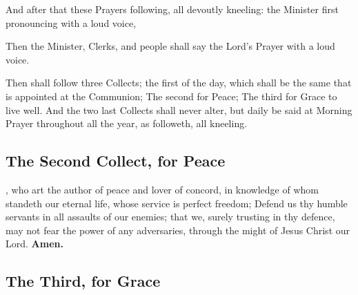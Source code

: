 

\begin{rubric}
And after that these Prayers following, all devoutly kneeling: the Minister first pronouncing with a loud voice,
\end{rubric}




\begin{rubric}
Then the Minister, Clerks, and people shall say the Lord's Prayer with a loud voice.
\end{rubric}




\begin{rubric}
Then shall follow three Collects; the first of the day, which shall be the same that is appointed at the Communion; The second for Peace; The third for Grace to live well. And the two last Collects shall never alter, but daily be said at Morning Prayer throughout all the year, as followeth, all kneeling.
\end{rubric}

\subsection{The Second Collect, for Peace}

, who art the author of peace and lover of concord, in knowledge of whom standeth our eternal life, whose service is perfect freedom; Defend us thy humble servants in all assaults of our enemies; that we, surely trusting in thy defence, may not fear the power of any adversaries, through the might of Jesus Christ our Lord.
\textbf{Amen.}

\subsection{The Third, for Grace}

